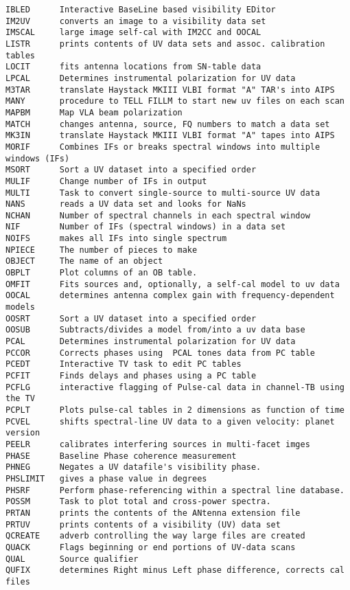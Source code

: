 \begin{verbatim}
IBLED      Interactive BaseLine based visibility EDitor
IM2UV      converts an image to a visibility data set
IMSCAL     large image self-cal with IM2CC and OOCAL
LISTR      prints contents of UV data sets and assoc. calibration tables
LOCIT      fits antenna locations from SN-table data
LPCAL      Determines instrumental polarization for UV data
M3TAR      translate Haystack MKIII VLBI format "A" TAR's into AIPS
MANY       procedure to TELL FILLM to start new uv files on each scan
MAPBM      Map VLA beam polarization
MATCH      changes antenna, source, FQ numbers to match a data set
MK3IN      translate Haystack MKIII VLBI format "A" tapes into AIPS
MORIF      Combines IFs or breaks spectral windows into multiple windows (IFs)
MSORT      Sort a UV dataset into a specified order
MULIF      Change number of IFs in output
MULTI      Task to convert single-source to multi-source UV data
NANS       reads a UV data set and looks for NaNs
NCHAN      Number of spectral channels in each spectral window
NIF        Number of IFs (spectral windows) in a data set
NOIFS      makes all IFs into single spectrum
NPIECE     The number of pieces to make
OBJECT     The name of an object
OBPLT      Plot columns of an OB table.
OMFIT      Fits sources and, optionally, a self-cal model to uv data
OOCAL      determines antenna complex gain with frequency-dependent models
OOSRT      Sort a UV dataset into a specified order
OOSUB      Subtracts/divides a model from/into a uv data base
PCAL       Determines instrumental polarization for UV data
PCCOR      Corrects phases using  PCAL tones data from PC table
PCEDT      Interactive TV task to edit PC tables
PCFIT      Finds delays and phases using a PC table
PCFLG      interactive flagging of Pulse-cal data in channel-TB using the TV
PCPLT      Plots pulse-cal tables in 2 dimensions as function of time
PCVEL      shifts spectral-line UV data to a given velocity: planet version
PEELR      calibrates interfering sources in multi-facet imges
PHASE      Baseline Phase coherence measurement
PHNEG      Negates a UV datafile's visibility phase.
PHSLIMIT   gives a phase value in degrees
PHSRF      Perform phase-referencing within a spectral line database.
POSSM      Task to plot total and cross-power spectra.
PRTAN      prints the contents of the ANtenna extension file
PRTUV      prints contents of a visibility (UV) data set
QCREATE    adverb controlling the way large files are created
QUACK      Flags beginning or end portions of UV-data scans
QUAL       Source qualifier
QUFIX      determines Right minus Left phase difference, corrects cal files

\end{verbatim}
